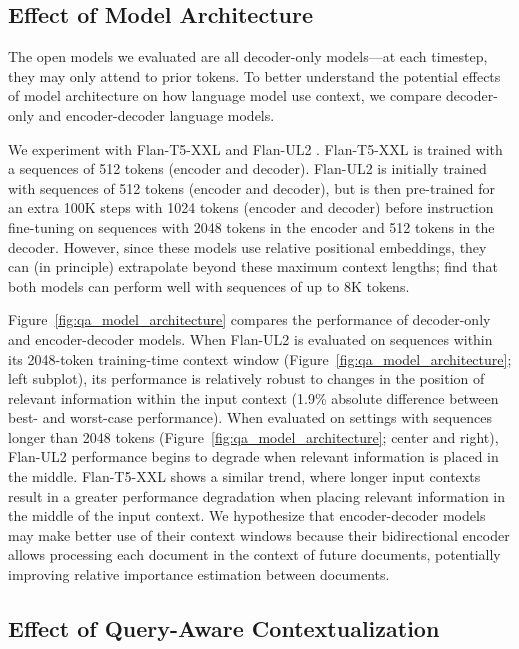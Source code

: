 \subsection{Effect of Model Architecture}\label{sec:architecture}

The open models we evaluated are all decoder-only models---at each timestep, they may only attend to prior tokens. To better understand the potential effects of model architecture on how language model use context, we compare decoder-only and encoder-decoder language models.

We experiment with Flan-T5-XXL \citep{JMLR:v21:20-074,chung2022scaling} and Flan-UL2 \citep{tay2023ul2}. Flan-T5-XXL is trained with a sequences of 512 tokens (encoder and decoder). Flan-UL2 is initially trained with sequences of 512 tokens (encoder and decoder), but is then pre-trained for an extra 100K steps with 1024 tokens (encoder and decoder) before instruction fine-tuning on sequences with 2048 tokens in the encoder and 512 tokens in the decoder. However, since these models use relative positional embeddings, they can (in principle) extrapolate beyond these maximum context lengths; \citet{shaham2023zeroscrolls} find that both models can perform well with sequences of up to 8K tokens.

Figure~\ref{fig:qa_model_architecture} compares the performance of decoder-only and encoder-decoder models. When Flan-UL2 is evaluated on sequences within its 2048-token training-time context window (Figure~\ref{fig:qa_model_architecture}; left subplot), its performance is relatively robust to changes in the position of relevant information within the input context (1.9\% absolute difference between best- and worst-case performance). When evaluated on settings with sequences longer than 2048 tokens (Figure~\ref{fig:qa_model_architecture}; center and right), Flan-UL2 performance begins to degrade when relevant information is placed in the middle. Flan-T5-XXL shows a similar trend, where longer input contexts result in a greater performance degradation when placing relevant information in the middle of the input context. We hypothesize that encoder-decoder models may make better use of their context windows because their bidirectional encoder allows processing each document in the context of future documents, potentially improving relative importance estimation between documents.

\subsection{Effect of Query-Aware Contextualization}\label{sec:pre_conditioning}

